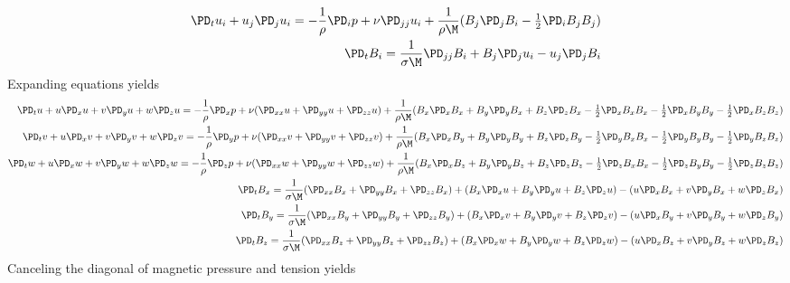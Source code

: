 \documentclass[11pt]{article}
\begin{document}
\begin{equation}\begin{aligned}
\PD_t u_i+u_j\PD_j u_i = - \frac{1}{\rho} \PD_i p+ \nu \PD_{jj} u_i + \frac{1}{\rho \M} (B_j \PD_j B_i - \tfrac{1}{2} \PD_i B_j B_j) \\
\PD_t B_i = \frac{1}{\sigma \M} \PD_{jj} B_i + B_j \PD_j u_i - u_j \PD_j B_i
\end{aligned} \end{equation}
Expanding equations yields
\tiny\begin{equation}\begin{aligned}
\PD_t u+ u\PD_x u + v\PD_y u + w\PD_z u = -\frac{1}{\rho}\PD_x p+ \nu (\PD_{xx} u+\PD_{yy} u+\PD_{zz} u) + \frac{1}{\rho \M} (B_x \PD_x B_x + B_y \PD_y B_x + B_z \PD_z B_x-\tfrac{1}{2}\PD_x B_x B_x-\tfrac{1}{2}\PD_x B_y B_y-\tfrac{1}{2}\PD_x B_z B_z) \\
\PD_t v+ u\PD_x v + v\PD_y v + w\PD_z v = -\frac{1}{\rho}\PD_y p+ \nu (\PD_{xx} v+\PD_{yy} v+\PD_{zz} v) + \frac{1}{\rho \M} (B_x \PD_x B_y + B_y \PD_y B_y + B_z \PD_z B_y-\tfrac{1}{2}\PD_y B_x B_x-\tfrac{1}{2}\PD_y B_y B_y-\tfrac{1}{2}\PD_y B_z B_z) \\
\PD_t w+ u\PD_x w + v\PD_y w + w\PD_z w = -\frac{1}{\rho}\PD_z p+ \nu (\PD_{xx} w+\PD_{yy} w+\PD_{zz} w) + \frac{1}{\rho \M} (B_x \PD_x B_z + B_y \PD_y B_z + B_z \PD_z B_z-\tfrac{1}{2}\PD_z B_x B_x-\tfrac{1}{2}\PD_z B_y B_y-\tfrac{1}{2}\PD_z B_z B_z) \\
\PD_t B_x = \frac{1}{\sigma \M} (\PD_{xx} B_x + \PD_{yy} B_x+\PD_{zz} B_x) + (B_x\PD_x u+B_y\PD_y u+B_z\PD_z u) - (u\PD_x B_x+v\PD_y B_x+w\PD_z B_x) \\
\PD_t B_y = \frac{1}{\sigma \M} (\PD_{xx} B_y + \PD_{yy} B_y+\PD_{zz} B_y) + (B_x\PD_x v+B_y\PD_y v+B_z\PD_z v) - (u\PD_x B_y+v\PD_y B_y+w\PD_z B_y) \\
\PD_t B_z = \frac{1}{\sigma \M} (\PD_{xx} B_z + \PD_{yy} B_z+\PD_{zz} B_z) + (B_x\PD_x w+B_y\PD_y w+B_z\PD_z w) - (u\PD_x B_z+v\PD_y B_z+w\PD_z B_z) \\
\end{aligned} \end{equation}\normalsize
Canceling the diagonal of magnetic pressure and tension yields
\end{document}
